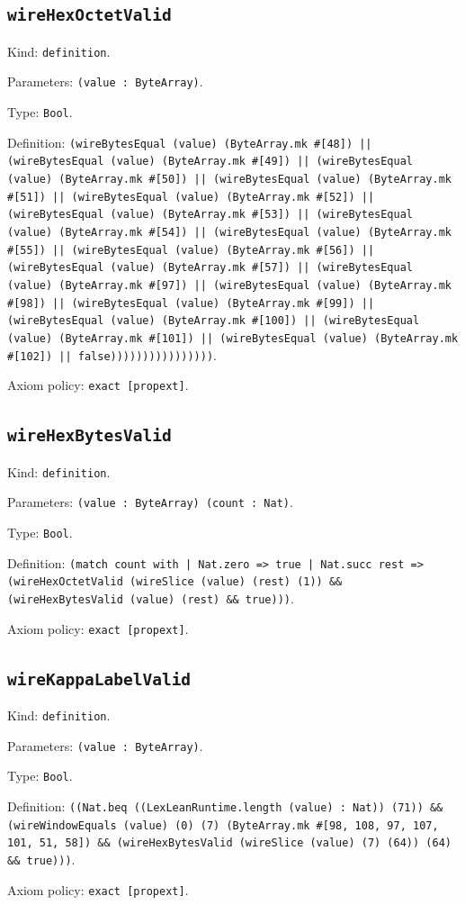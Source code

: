 \documentclass[11pt]{article}
\begin{document}
\subsection*{\texttt{wireHexOctetValid}}
\noindent Kind: \texttt{definition}.\par
\noindent Parameters: \texttt{(value : ByteArray)}.\par
\noindent Type: \texttt{Bool}.\par
\noindent Definition: \texttt{(wireBytesEqual (value) (ByteArray.mk \#[48]) || (wireBytesEqual (value) (ByteArray.mk \#[49]) || (wireBytesEqual (value) (ByteArray.mk \#[50]) || (wireBytesEqual (value) (ByteArray.mk \#[51]) || (wireBytesEqual (value) (ByteArray.mk \#[52]) || (wireBytesEqual (value) (ByteArray.mk \#[53]) || (wireBytesEqual (value) (ByteArray.mk \#[54]) || (wireBytesEqual (value) (ByteArray.mk \#[55]) || (wireBytesEqual (value) (ByteArray.mk \#[56]) || (wireBytesEqual (value) (ByteArray.mk \#[57]) || (wireBytesEqual (value) (ByteArray.mk \#[97]) || (wireBytesEqual (value) (ByteArray.mk \#[98]) || (wireBytesEqual (value) (ByteArray.mk \#[99]) || (wireBytesEqual (value) (ByteArray.mk \#[100]) || (wireBytesEqual (value) (ByteArray.mk \#[101]) || (wireBytesEqual (value) (ByteArray.mk \#[102]) || false))))))))))))))))}.\par
\noindent Axiom policy: \texttt{exact [propext]}.\par
\subsection*{\texttt{wireHexBytesValid}}
\noindent Kind: \texttt{definition}.\par
\noindent Parameters: \texttt{(value : ByteArray) (count : Nat)}.\par
\noindent Type: \texttt{Bool}.\par
\noindent Definition: \texttt{(match count with | Nat.zero => true | Nat.succ rest => (wireHexOctetValid (wireSlice (value) (rest) (1)) \&\& (wireHexBytesValid (value) (rest) \&\& true)))}.\par
\noindent Axiom policy: \texttt{exact [propext]}.\par
\subsection*{\texttt{wireKappaLabelValid}}
\noindent Kind: \texttt{definition}.\par
\noindent Parameters: \texttt{(value : ByteArray)}.\par
\noindent Type: \texttt{Bool}.\par
\noindent Definition: \texttt{((Nat.beq ((LexLeanRuntime.length (value) : Nat)) (71)) \&\& (wireWindowEquals (value) (0) (7) (ByteArray.mk \#[98, 108, 97, 107, 101, 51, 58]) \&\& (wireHexBytesValid (wireSlice (value) (7) (64)) (64) \&\& true)))}.\par
\noindent Axiom policy: \texttt{exact [propext]}.\par
\end{document}

